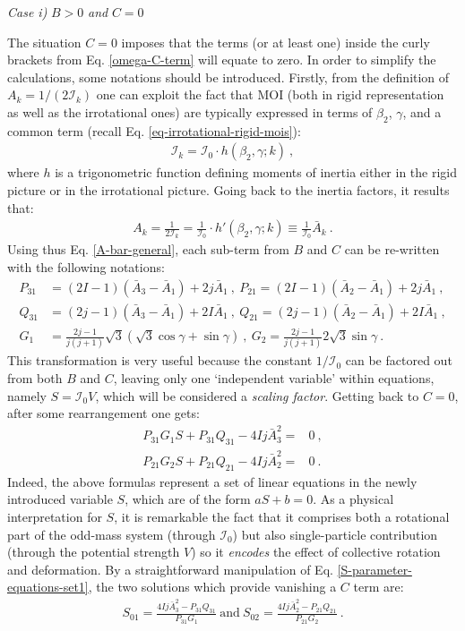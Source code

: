 \textit{Case i)} $B>0$ \textit{and} $C=0$

The situation $C=0$ imposes that the terms (or at least one) inside the curly brackets from Eq. \ref{omega-C-term} will equate to zero. In order to simplify the calculations, some notations should be introduced. Firstly, from the definition of $A_k=1/(2\mathcal{I}_k)$ one can exploit the fact that MOI (both in rigid representation as well as the irrotational ones) are typically expressed in terms of $\beta_2$, $\gamma$, and a common term (recall Eq. \ref{eq-irrotational-rigid-mois}):
\begin{align}
    \mathcal{I}_k=\mathcal{I}_0\cdot h(\beta_2,\gamma;k)\ ,
\end{align}
where $h$ is a trigonometric function defining moments of inertia either in the rigid picture or in the irrotational picture. Going back to the inertia factors, it results that:
\begin{align}
    A_k=\frac{1}{2\mathcal{I}_k}=\frac{1}{\mathcal{I}_0}\cdot h'(\beta_2,\gamma;k)\equiv\frac{1}{\mathcal{I}_0}\bar{A}_k\ .
    \label{A-bar-general}
\end{align}
Using thus Eq. \ref{A-bar-general}, each sub-term from $B$ and $C$ can be re-written with the following notations:
\begin{align}
    P_{31}&=(2I-1)(\bar{A}_3-\bar{A}_1)+2j\bar{A}_1\ ,\ P_{21}=(2I-1)(\bar{A}_2-\bar{A}_1)+2j\bar{A}_1\ , \nonumber\\
    Q_{31}&=(2j-1)(\bar{A}_3-\bar{A}_1)+2I\bar{A}_1\ ,\ Q_{21}=(2j-1)(\bar{A}_2-\bar{A}_1)+2I\bar{A}_1\ ,\nonumber\\
    G_1&=\frac{2j-1}{j(j+1)}\sqrt{3}\left(\sqrt{3}\cos\gamma+\sin\gamma\right)\ ,\ G_2=\frac{2j-1}{j(j+1)}2\sqrt{3}\sin\gamma\ .
    \label{P-Q-G1-G2-factors}
\end{align}
This transformation is very useful because the constant $1/\mathcal{I}_0$ can be factored out from both $B$ and $C$, leaving only one `independent variable' within equations, namely $S=\mathcal{I}_0V$, which will be considered a \emph{scaling factor}. Getting back to $C=0$, after some rearrangement one gets:
\begin{align}
    P_{31}G_1S+P_{31}Q_{31}-4Ij\bar{A}_3^2=&0\ ,\nonumber\\
    P_{21}G_2S+P_{21}Q_{21}-4Ij\bar{A}_2^2=&0\ .
    \label{S-parameter-equations-set1}
\end{align}
Indeed, the above formulas represent a set of linear equations in the newly introduced variable $S$, which are of the form $aS+b=0$. As a physical interpretation for $S$, it is remarkable the fact that it comprises both a rotational part of the odd-mass system (through $\mathcal{I}_0$) but also single-particle contribution (through the potential strength $V$) so it \emph{encodes} the effect of collective rotation and deformation. By a straightforward manipulation of Eq. \ref{S-parameter-equations-set1}, the two solutions which provide vanishing a $C$ term are:
\begin{align}
    S_{01}=\frac{4Ij\bar{A}_3^2-P_{31}Q_{31}}{P_{31}G_1}\ \text{and}\ S_{02}=\frac{4Ij\bar{A}_2^2-P_{21}Q_{21}}{P_{21}G_2}\ .
    \label{C-Term-zero-solutions}
\end{align}

